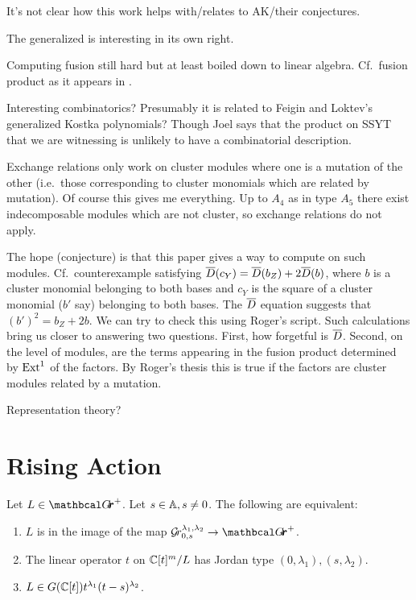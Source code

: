 \documentclass[draft]{article}
\begin{document}
It's not clear how this work helps with/relates to AK/their conjectures.

The generalized \mvy is interesting in its own right. 

Computing fusion still hard but at least boiled down to linear algebra. Cf.\ fusion product as it appears in \cite{beilinson1991quantization,feigin2generalized,mirkovic2007geometric,anderson2006algebra,bezrukavnikov2005equivariant}.

Interesting combinatorics? Presumably it is related to Feigin and Loktev's generalized Kostka polynomials? Though Joel says that the product on SSYT that we are witnessing is unlikely to have a combinatorial description. 

Exchange relations only work on cluster modules where one is a mutation of the other (i.e.\ those corresponding to cluster monomials which are related by mutation). Of course this gives me everything. Up to $A_4$ as in type $A_5$ there exist indecomposable modules which are not cluster, so exchange relations do not apply. 

The hope (conjecture) is that this paper gives a way to compute on such modules. Cf.\ counterexample satisfying $\barD(c_Y) = \barD(b_Z) + 2\barD(b)$, where $b$ is a cluster monomial belonging to both bases and $c_Y$ is the square of a cluster monomial ($b'$ say) belonging to both bases. The $\barD$ equation suggests that $(b')^2 = b_Z + 2b$. We can try to check this using Roger's script. Such calculations bring us closer to answering two questions. First, how forgetful is $\barD$. Second, on the level of modules, are the terms appearing in the fusion product determined by $\Ext^1$ of the factors. By Roger's thesis this is true if the factors are cluster modules related by a mutation. 


Representation theory? 

\section{Rising Action} %

\begin{lemma} \label{le:Grl1l2}
    Let $ L \in \Grth^+ $.  Let $ s \in \AA, s \ne 0 $.  The following are equivalent:
    \begin{enumerate}
        \item $ L $ is in the image of the map $ \Gr^{\lambda_1, \lambda_2}_{0,s} \rightarrow \Grth^+$. 
        \item The linear operator $ t $ on $ \CC[t]^m/L$ has Jordan type $(0,\lambda_1), (s,\lambda_2)$.
        \item $ L \in G(\CC[t]) t^{\lambda_1} (t-s)^{\lambda_2}$.
    \end{enumerate}
\end{lemma}
\end{document}
